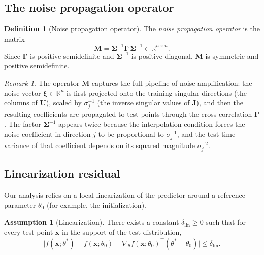 \documentclass[12pt]{amsart}
\theoremstyle{definition}
\newtheorem{definition}[theorem]{Definition}
\newtheorem{assumption}[theorem]{Assumption}
\theoremstyle{remark}
\newtheorem{remark}[theorem]{Remark}
\newcommand{\R}{\mathbb{R}}
\newcommand{\bx}{\mathbf{x}}
\newcommand{\bJ}{\mathbf{J}}
\newcommand{\bM}{\mathbf{M}}
\newcommand{\bU}{\mathbf{U}}
\begin{document}
\subsection{The noise propagation operator}

\begin{definition}[Noise propagation operator]\label{def:M}
The \emph{noise propagation operator} is the matrix
\begin{equation}\label{eq:M}
  \bM = \boldsymbol{\Sigma}^{-1} \boldsymbol{\Gamma}\,
        \boldsymbol{\Sigma}^{-1} \in \R^{n \times n}.
\end{equation}
Since $\boldsymbol{\Gamma}$ is positive semidefinite and
$\boldsymbol{\Sigma}^{-1}$ is positive diagonal, $\bM$ is symmetric and positive
semidefinite.
\end{definition}

\begin{remark}\label{rem:M-interpretation}
The operator $\bM$ captures the full pipeline of noise amplification: the noise
vector $\boldsymbol{\xi} \in \R^{n}$ is first projected onto the training
singular directions (the columns of $\bU$), scaled by $\sigma_{j}^{-1}$ (the
inverse singular values of $\bJ$), and then the resulting coefficients are
propagated to test points through the cross-correlation $\boldsymbol{\Gamma}$.
The factor $\boldsymbol{\Sigma}^{-1}$ appears twice because the interpolation
condition forces the noise coefficient in direction $j$ to be proportional to
$\sigma_{j}^{-1}$, and the test-time variance of that coefficient depends on its
squared magnitude $\sigma_{j}^{-2}$.
\end{remark}

\subsection{Linearization residual}

Our analysis relies on a local linearization of the predictor around a reference
parameter $\theta_{0}$ (for example, the initialization).

\begin{assumption}[Linearization]\label{ass:lin}
There exists a constant $\delta_{\mathrm{lin}} \geq 0$ such that for every test
point $\bx$ in the support of the test distribution,
\begin{equation}\label{eq:lin-residual}
  \bigl\lvert
    f(\bx; \theta^{*}) - f(\bx; \theta_{0})
    - \nabla_{\theta} f(\bx; \theta_{0})^{\top}(\theta^{*} - \theta_{0})
  \bigr\rvert
  \leq \delta_{\mathrm{lin}}.
\end{equation}
\end{assumption}
\end{document}
